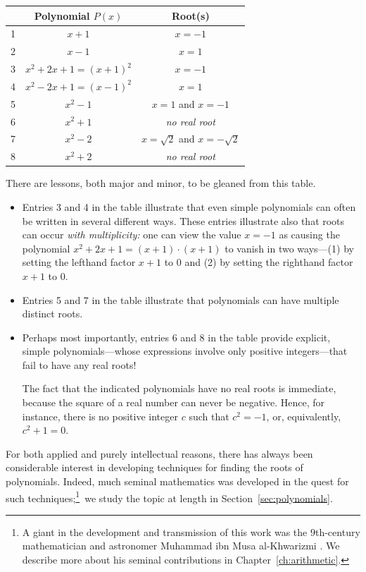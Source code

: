 \smallskip

\begin{tabular}{|c|c|c|}
\hline
 & Polynomial $P(x)$ & Root(s) \\
\hline
1 &
$x+1$  &  $x= -1$ \\
2 &
$x-1$  &  $x= 1$ \\
3 &
$x^2 + 2x +1 = (x+1)^2$ & $x = -1$ \\ 
4 &
$x^2 - 2x +1 = (x-1)^2$ & $x = 1$ \\ 
5 &
$x^2 - 1$ & $x = 1$ and $x= -1$ \\
6 &
$x^2 + 1$ & {\em no real root} \\
7 &
$x^2 -2$  & $x = \sqrt{2}$ and $x = - \sqrt{2}$ \\
8 &
$x^2 + 2$ & {\em no real root} \\
\hline
\end{tabular}

\bigskip

\noindent
There are lessons, both major and minor, to be gleaned from this table.

\begin{itemize}
\item
Entries 3 and 4 in the table illustrate that even simple polynomials
can often be written in several different ways.  These entries
illustrate also that roots can occur {\em with multiplicity:}
 one can view the value $x = -1$
as causing the polynomial $x^2 + 2x +1 = (x+1)\cdot (x+1)$ to vanish
in two ways---(1) by setting the lefthand factor $x+1$ to $0$ and
(2) by setting the righthand factor $x+1$ to $0$.

\item
Entries 5 and 7 in the table illustrate that polynomials can have
multiple distinct roots.

\item
Perhaps most importantly, entries 6 and 8 in the table provide
explicit, simple polynomials---whose expressions involve only positive
integers---that fail to have any real roots!

The fact that the indicated polynomials have no real roots is
immediate, because the square of a real number can never be negative.
Hence, for instance, there is no positive integer $c$ such that $c^2 =
-1$, or, equivalently, $c^2 + 1 = 0$.
\end{itemize}

\smallskip

For both applied and purely intellectual reasons, there has always
been considerable interest in developing techniques for finding the
roots of polynomials.  Indeed, much seminal mathematics was developed
in the quest for such techniques;\footnote{A giant in the development
  and transmission of this work was the $9$th-century mathematician
  and astronomer Muhammad ibn Musa al-Khwarizmi .  We describe more about his seminal contributions in
  Chapter~\ref{ch:arithmetic}.}~we study the topic at length in
Section~\ref{sec:polynomials}.

